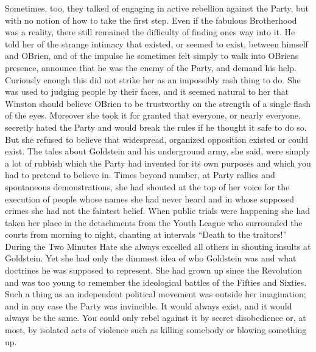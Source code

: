 \begin{paracol}{2}
Sometimes, too, they talked of engaging in active rebellion against the
Party, but with no notion of how to take the first step. Even if the
fabulous Brotherhood was a reality, there still remained the difficulty
of finding one\textquotesingle s way into it. He told her of the strange
intimacy that existed, or seemed to exist, between himself and
O\textquotesingle Brien, and of the impulse he sometimes felt simply to
walk into O\textquotesingle Brien\textquotesingle s presence, announce
that he was the enemy of the Party, and demand his help. Curiously
enough this did not strike her as an impossibly rash thing to do. She
was used to judging people by their faces, and it seemed natural to her
that Winston should believe O\textquotesingle Brien to be trustworthy on
the strength of a single flash of the eyes. Moreover she took it for
granted that everyone, or nearly everyone, secretly hated the Party and
would break the rules if he thought it safe to do so. But she refused to
believe that widespread, organized opposition existed or could exist.
The tales about Goldstein and his underground army, she said, were
simply a lot of rubbish which the Party had invented for its own
purposes and which you had to pretend to believe in. Times beyond
number, at Party rallies and spontaneous demonstrations, she had shouted
at the top of her voice for the execution of people whose names she had
never heard and in whose supposed crimes she had not the faintest
belief. When public trials were happening she had taken her place in the
detachments from the Youth League who surrounded the courts from morning
to night, chanting at intervals ``Death to the traitors!'' During the Two
Minutes Hate she always excelled all others in shouting insults at
Goldstein. Yet she had only the dimmest idea of who Goldstein was and
what doctrines he was supposed to represent. She had grown up since the
Revolution and was too young to remember the ideological battles of the
Fifties and Sixties. Such a thing as an independent political movement
was outside her imagination; and in any case the Party was invincible.
It would always exist, and it would always be the same. You could only
rebel against it by secret disobedience or, at most, by isolated acts of
violence such as killing somebody or blowing something up.

\switchcolumn


\end{paracol}
